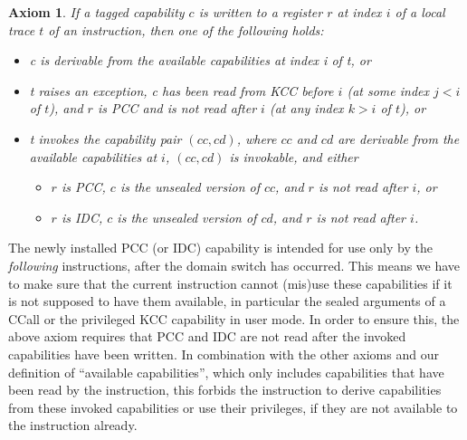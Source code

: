 \documentclass[11pt]{article}
\newtheorem{axiom}{Axiom}
\theoremstyle{definition}
\newcommand{\Note}[1]{{\color{magenta}[#1]}}
\begin{document}
\begin{axiom}
  \label{axiom:reg-write}
  If a tagged capability $c$ is written to a register $r$ at index $i$ of a
  local trace $t$ of an instruction, then one of the
  following holds:
  \begin{itemize}
  \item c is derivable from the available capabilities at index i of t, or
  \item t raises an exception, c has been read from KCC before $i$ (at some index $j < i$ of $t$), and $r$ is
    PCC and is not read after $i$ (at any index $k > i$ of $t$), or
  \item t invokes the capability pair $(cc, cd)$, where $cc$ and $cd$ are derivable from the available capabilities
    at $i$, $(cc, cd)$ is invokable, and either
    \begin{itemize}
    \item $r$ is PCC, $c$ is the unsealed version of $cc$, and $r$ is not read after $i$, or
    \item $r$ is IDC, $c$ is the unsealed version of $cd$, and $r$ is not read after $i$.
    \end{itemize}
  \end{itemize}
\end{axiom}




The newly installed PCC (or IDC) capability is intended for use only by the
\emph{following} instructions, after the domain switch has occurred.  This
means we have to make sure that the current instruction cannot (mis)use these
capabilities if it is not supposed to have them available, in particular the
sealed arguments of a CCall or the privileged KCC capability in user mode.  In
order to ensure this, the above axiom requires that PCC and IDC are not read
after the invoked capabilities have been written.  In combination with the
other axioms and our definition of ``available capabilities'', which only
includes capabilities that have been read by the instruction, this forbids the
instruction to derive capabilities from these invoked capabilities or use their
privileges, if they are not available to the instruction already.
\end{document}
